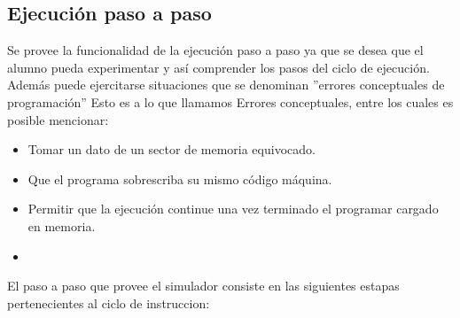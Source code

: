\subsection{Ejecución paso a paso}

Se provee la funcionalidad de la ejecución paso a paso ya que se desea que el alumno pueda experimentar y así comprender los pasos del ciclo de ejecución. Además puede ejercitarse situaciones que se denominan ''errores conceptuales de programación'' Esto es a lo que llamamos Errores conceptuales, entre los cuales es posible mencionar:

\begin{itemize}
\item Tomar un dato de un sector de memoria equivocado.
\item Que el programa sobrescriba su mismo código máquina.
\item Permitir que la ejecución continue una vez terminado el programar cargado en memoria.
\item 
\end{itemize}

El paso a paso que provee el simulador consiste en las siguientes estapas pertenecientes al ciclo de instruccion:

